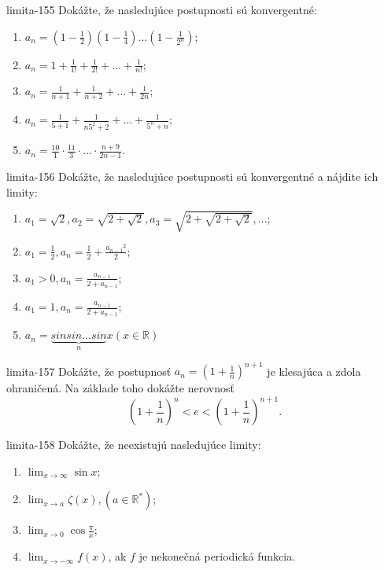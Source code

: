 \begin{defproblem}{limita-155}
Dokážte, že nasledujúce postupnosti sú konvergentné:
\begin{enumerate}
\item $a_n=(1-\frac{1}{2})(1-\frac{1}{4})...(1-\frac{1}{2^n})$;
\item $a_n=1+\frac{1}{1!}+\frac{1}{2!}+...+\frac{1}{n!}$;
\item $a_n=\frac{1}{n+1}+\frac{1}{n+2}+...+\frac{1}{2n}$;
\item $a_n=\frac{1}{5+1}+\frac{1}{n5^2+2}+...+\frac{1}{5^n+n}$;
\item $a_n=\frac{10}{1}\cdot \frac{11}{3}\cdot ...\cdot \frac{n+9}{2n-1}$.
\end{enumerate}
\end{defproblem}

\begin{defproblem}{limita-156}
Dokážte, že nasledujúce postupnosti sú konvergentné a nájdite ich limity:
\begin{enumerate}
\item $a_1=\sqrt{2}, a_2=\sqrt{2+\sqrt{2}}, a_3=\sqrt{2+\sqrt{2+\sqrt{2}}},...$;
\item $a_1=\frac{1}{2}, a_n=\frac{1}{2}+\frac{{a_{n-1}}^{2}}{2}$;
\item $a_1>0, a_n=\frac{a_{n-1}}{2+a_{n-1}}$;
\item $a_1=1, a_n=\frac{a_{n-1}}{2+a_{n-1}}$;
\item $a_n=\underbrace{sin sin ... sin}_n x (x \in \mathbb{R})$
\end{enumerate}
\end{defproblem}

\begin{defproblem}{limita-157}
Dokážte, že postupnosť $a_{n}=(1+\frac{1}{n})^{n+1}$ je klesajúca a zdola ohraničená. Na základe toho dokážte nerovnosť
$$(1+\frac{1}{n})^n<e<(1+\frac{1}{n})^{n+1}.$$
\end{defproblem}

\begin{defproblem}{limita-158}
Dokážte, že neexistujú nasledujúce limity:
\begin{multicols}{2}
\begin{enumerate}
    \item $\lim_{{x \rightarrow \infty}} \sin x$;
    \item $\lim_{{x \rightarrow a}} \zeta (x), (a \in \mathbb{R^*})$;
    \item $\lim_{{x \rightarrow 0}} \cos \frac{\pi}{x}$;
    \item $\lim_{{x \rightarrow -\infty}} f(x)$, ak $f$ je nekonečná periodická funkcia.
\end{enumerate}
\end{multicols}
\end{defproblem}

